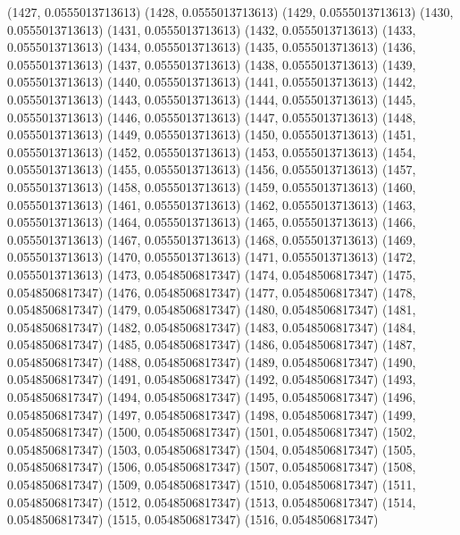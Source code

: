 {					(1427, 0.0555013713613)
					(1428, 0.0555013713613)
					(1429, 0.0555013713613)
					(1430, 0.0555013713613)
					(1431, 0.0555013713613)
					(1432, 0.0555013713613)
					(1433, 0.0555013713613)
					(1434, 0.0555013713613)
					(1435, 0.0555013713613)
					(1436, 0.0555013713613)
					(1437, 0.0555013713613)
					(1438, 0.0555013713613)
					(1439, 0.0555013713613)
					(1440, 0.0555013713613)
					(1441, 0.0555013713613)
					(1442, 0.0555013713613)
					(1443, 0.0555013713613)
					(1444, 0.0555013713613)
					(1445, 0.0555013713613)
					(1446, 0.0555013713613)
					(1447, 0.0555013713613)
					(1448, 0.0555013713613)
					(1449, 0.0555013713613)
					(1450, 0.0555013713613)
					(1451, 0.0555013713613)
					(1452, 0.0555013713613)
					(1453, 0.0555013713613)
					(1454, 0.0555013713613)
					(1455, 0.0555013713613)
					(1456, 0.0555013713613)
					(1457, 0.0555013713613)
					(1458, 0.0555013713613)
					(1459, 0.0555013713613)
					(1460, 0.0555013713613)
					(1461, 0.0555013713613)
					(1462, 0.0555013713613)
					(1463, 0.0555013713613)
					(1464, 0.0555013713613)
					(1465, 0.0555013713613)
					(1466, 0.0555013713613)
					(1467, 0.0555013713613)
					(1468, 0.0555013713613)
					(1469, 0.0555013713613)
					(1470, 0.0555013713613)
					(1471, 0.0555013713613)
					(1472, 0.0555013713613)
					(1473, 0.0548506817347)
					(1474, 0.0548506817347)
					(1475, 0.0548506817347)
					(1476, 0.0548506817347)
					(1477, 0.0548506817347)
					(1478, 0.0548506817347)
					(1479, 0.0548506817347)
					(1480, 0.0548506817347)
					(1481, 0.0548506817347)
					(1482, 0.0548506817347)
					(1483, 0.0548506817347)
					(1484, 0.0548506817347)
					(1485, 0.0548506817347)
					(1486, 0.0548506817347)
					(1487, 0.0548506817347)
					(1488, 0.0548506817347)
					(1489, 0.0548506817347)
					(1490, 0.0548506817347)
					(1491, 0.0548506817347)
					(1492, 0.0548506817347)
					(1493, 0.0548506817347)
					(1494, 0.0548506817347)
					(1495, 0.0548506817347)
					(1496, 0.0548506817347)
					(1497, 0.0548506817347)
					(1498, 0.0548506817347)
					(1499, 0.0548506817347)
					(1500, 0.0548506817347)
					(1501, 0.0548506817347)
					(1502, 0.0548506817347)
					(1503, 0.0548506817347)
					(1504, 0.0548506817347)
					(1505, 0.0548506817347)
					(1506, 0.0548506817347)
					(1507, 0.0548506817347)
					(1508, 0.0548506817347)
					(1509, 0.0548506817347)
					(1510, 0.0548506817347)
					(1511, 0.0548506817347)
					(1512, 0.0548506817347)
					(1513, 0.0548506817347)
					(1514, 0.0548506817347)
					(1515, 0.0548506817347)
					(1516, 0.0548506817347)
}
